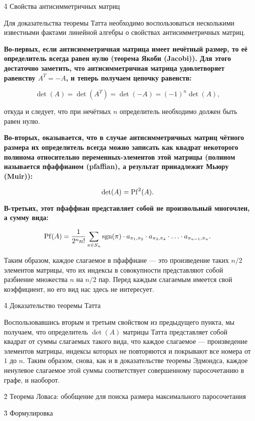\h4{ Свойства антисимметричных матриц }

Для доказательства теоремы Татта необходимо воспользоваться несколькими известными фактами линейной алгебры о свойствах антисимметричных матриц.

\bf{Во-первых}, если антисимметричная матрица имеет нечётный размер, то её определитель всегда равен нулю (теорема Якоби (Jacobi)). Для этого достаточно заметить, что антисимметричная матрица удовлетворяет равенству $A^T = -A$, и теперь получаем цепочку равенств:

$$ \det(A) = \det(A^T) = \det(-A) = (-1)^n \det(A), $$

откуда и следует, что при нечётных $n$ определитель необходимо должен быть равен нулю.

\bf{Во-вторых}, оказывается, что в случае антисимметричных матриц чётного размера их определитель всегда можно записать как квадрат некоторого полинома относительно переменных-элементов этой матрицы (полином называется пфаффианом (pfaffian), а результат принадлежит Мьюру (Muir)):

$$ \det(A) = {\rm Pf}^2(A). $$

\bf{В-третьих}, этот пфаффиан представляет собой не произвольный многочлен, а сумму вида:

$$ {\rm Pf}(A) = \frac{ 1 }{ 2^n n! } \sum_{\pi \in S_n} {\rm sgn(\pi)} \cdot a_{\pi_1,\pi_2} \cdot a_{\pi_3,\pi_4} \cdot \ldots \cdot a_{\pi_{n-1},\pi_n}. $$

Таким образом, каждое слагаемое в пфаффиане --- это произведение таких $n/2$ элементов матрицы, что их индексы в совокупности представляют собой разбиение множества $n$ на $n/2$ пар. Перед каждым слагаемым имеется свой коэффициент, но его вид нас здесь не интересует.


\h4{ Доказательство теоремы Татта }

Воспользовавшись вторым и третьим свойством из предыдущего пункта, мы получаем, что определитель $\det(A)$ матрицы Татта представляет собой квадрат от суммы слагаемых такого вида, что каждое слагаемое --- произведение элементов матрицы, индексы которых не повторяются и покрывают все номера от $1$ до $n$. Таким образом, снова, как и в доказательстве теоремы Эдмондса, каждое ненулевое слагаемое этой суммы соответствует совершенному паросочетанию в графе, и наоборот.


\h2{ Теорема Ловаса: обобщение для поиска размера максимального паросочетания }


\h3{ Формулировка }

